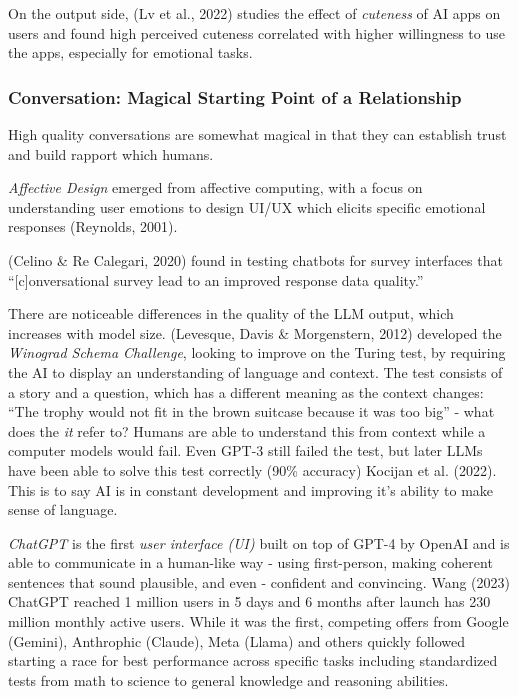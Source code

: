 \documentclass[
  letterpaper,
  DIV=11,
  numbers=noendperiod]{scrartcl}
\begin{document}
On the output side, (Lv et al., 2022) studies the effect of
\emph{cuteness} of AI apps on users and found high perceived cuteness
correlated with higher willingness to use the apps, especially for
emotional tasks.

\subsubsection{Conversation: Magical Starting Point of a
Relationship}\label{conversation-magical-starting-point-of-a-relationship}

High quality conversations are somewhat magical in that they can
establish trust and build rapport which humans.

\emph{Affective Design} emerged from affective computing, with a focus
on understanding user emotions to design UI/UX which elicits specific
emotional responses (Reynolds, 2001).

(Celino \& Re Calegari, 2020) found in testing chatbots for survey
interfaces that ``{[}c{]}onversational survey lead to an improved
response data quality.''

There are noticeable differences in the quality of the LLM output, which
increases with model size. (Levesque, Davis \& Morgenstern, 2012)
developed the \emph{Winograd Schema Challenge}, looking to improve on
the Turing test, by requiring the AI to display an understanding of
language and context. The test consists of a story and a question, which
has a different meaning as the context changes: ``The trophy would not
fit in the brown suitcase because it was too big'' - what does the
\emph{it} refer to? Humans are able to understand this from context
while a computer models would fail. Even GPT-3 still failed the test,
but later LLMs have been able to solve this test correctly (90\%
accuracy) Kocijan et al. (2022). This is to say AI is in constant
development and improving it's ability to make sense of language.

\emph{ChatGPT} is the first \emph{user interface (UI)} built on top of
GPT-4 by OpenAI and is able to communicate in a human-like way - using
first-person, making coherent sentences that sound plausible, and even -
confident and convincing. Wang (2023) ChatGPT reached 1 million users in
5 days and 6 months after launch has 230 million monthly active users.
While it was the first, competing offers from Google (Gemini),
Anthrophic (Claude), Meta (Llama) and others quickly followed starting a
race for best performance across specific tasks including standardized
tests from math to science to general knowledge and reasoning abilities.
\end{document}
